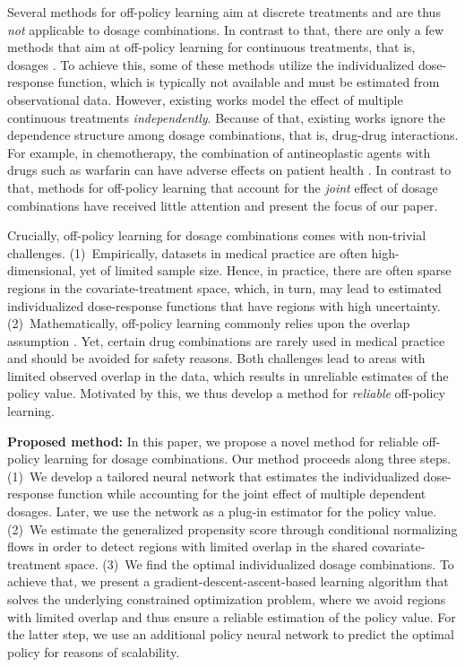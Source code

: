 \documentclass{article}
\theoremstyle{definition}
\theoremstyle{plain}
\begin{document}
Several methods for off-policy learning aim at discrete treatments \cite{Athey.2021, Bennett.2020, Bennett.2019b, Dudik.2014, Hatt.2022b, Kallus.2018, Kallus.2022b, Thomas.2016, Tschernutter.2022} and are thus \emph{not} applicable to dosage combinations. In contrast to that, there are only a few methods that aim at off-policy learning for continuous treatments, that is, dosages \cite{Chen.2016, Demirer.2019, Kallus.2018e, AkshayKrishnamurthy.2020, Zou.2022}. To achieve this, some of these methods utilize the individualized dose-response function, which is typically not available and must be estimated from observational data. However, existing works model the effect of multiple continuous treatments \emph{independently}. Because of that, existing works ignore the dependence structure among dosage combinations, that is, drug-drug interactions. For example, in chemotherapy, the combination of antineoplastic agents with drugs such as warfarin can have adverse effects on patient health \cite{Riechelmann.2007}. In contrast to that, methods for off-policy learning that account for the \emph{joint} effect of dosage combinations have received little attention and present the focus of our paper.      

Crucially, off-policy learning for dosage combinations comes with non-trivial challenges. (1)~Empirically, datasets in medical practice are often high-dimensional, yet of limited sample size. Hence, in practice, there are often sparse regions in the covariate-treatment space, which, in turn, may lead to estimated individualized dose-response functions that have regions with high uncertainty. (2)~Mathematically, off-policy learning commonly relies upon the {overlap assumption} \cite{Rubin.1974}. Yet, certain drug combinations are rarely used in medical practice and should be avoided for safety reasons. Both challenges lead to areas with limited observed overlap in the data, which results in unreliable estimates of the policy value. Motivated by this, we thus develop a method for \emph{reliable} off-policy learning. 


\textbf{Proposed method:} In this paper, we propose a novel method for reliable off-policy learning for dosage combinations. Our method proceeds along three steps. (1)~We develop a tailored neural network that estimates the individualized dose-response function while accounting for the joint effect of multiple dependent dosages. Later, we use the network as a plug-in estimator for the policy value. (2)~We estimate the generalized propensity score through conditional normalizing flows in order to detect regions with limited overlap in the shared covariate-treatment space. (3)~We find the optimal individualized dosage combinations. To achieve that, we present a gradient-descent-ascent-based learning algorithm that solves the underlying constrained optimization problem, where we avoid regions with limited overlap and thus ensure a reliable estimation of the policy value. For the latter step, we use an additional policy neural network to predict the optimal policy for reasons of scalability.
\end{document}
